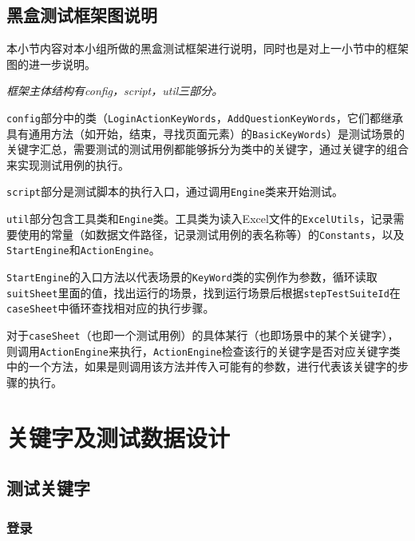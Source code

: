 \documentclass[hyperref, a4paper]{ctexart}
\begin{document}
\pagebreak

\hypertarget{ux9ed1ux76d2ux6d4bux8bd5ux6846ux67b6ux56feux8bf4ux660e}{%
\subsection{黑盒测试框架图说明}\label{ux9ed1ux76d2ux6d4bux8bd5ux6846ux67b6ux56feux8bf4ux660e}}

本小节内容对本小组所做的黑盒测试框架进行说明，同时也是对上一小节中的框架图的进一步说明。

\emph{框架主体结构有config，script，util三部分。}

\texttt{config}部分中的类（\texttt{LoginActionKeyWords}，\texttt{AddQuestionKeyWords}，它们都继承具有通用方法（如开始，结束，寻找页面元素）的\texttt{BasicKeyWords}）是测试场景的关键字汇总，需要测试的测试用例都能够拆分为类中的关键字，通过关键字的组合来实现测试用例的执行。

\texttt{script}部分是测试脚本的执行入口，通过调用\texttt{Engine}类来开始测试。

\texttt{util}部分包含工具类和\texttt{Engine}类。工具类为读入Excel文件的\texttt{ExcelUtils}，记录需要使用的常量（如数据文件路径，记录测试用例的表名称等）的\texttt{Constants}，以及\texttt{StartEngine}和\texttt{ActionEngine}。

\texttt{StartEngine}的入口方法以代表场景的\texttt{KeyWord}类的实例作为参数，循环读取\texttt{suitSheet}里面的值，找出运行的场景，找到运行场景后根据\texttt{stepTestSuiteId}在\texttt{caseSheet}中循环查找相对应的执行步骤。

对于\texttt{caseSheet}（也即一个测试用例）的具体某行（也即场景中的某个关键字），则调用\texttt{ActionEngine}来执行，\texttt{ActionEngine}检查该行的关键字是否对应关键字类中的一个方法，如果是则调用该方法并传入可能有的参数，进行代表该关键字的步骤的执行。

\hypertarget{ux5173ux952eux5b57ux53caux6d4bux8bd5ux6570ux636eux8bbeux8ba1}{%
\section{关键字及测试数据设计}\label{ux5173ux952eux5b57ux53caux6d4bux8bd5ux6570ux636eux8bbeux8ba1}}

\hypertarget{ux6d4bux8bd5ux5173ux952eux5b57}{%
\subsection{测试关键字}\label{ux6d4bux8bd5ux5173ux952eux5b57}}

\hypertarget{ux767bux5f55}{%
\subsubsection{登录}\label{ux767bux5f55}}
\end{document}
